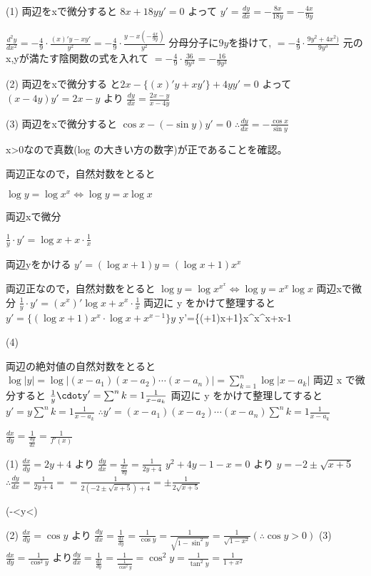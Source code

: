 (1) 両辺をxで微分すると 
$
8x+18yy'=0
$
よって
$
y'=\frac{dy}{dx}=-\frac{8x}{18y}=-\frac{4x}{9y}
$

$
\frac{d^2y}{dx^2}=-\frac{4}{9}\cdot\frac{(x)'y-xy'}{y^2}=-\frac{4}{9}\cdot\frac{y-x(-\frac{4x}{9y})}{y^2}
$
分母分子に$ 9y$を掛けて, 
$
= -\frac{4}{9}\cdot\frac{9y^2+4x^2)}{9y^3}
$
元のx,yが満たす陰関数の式を入れて
$
= -\frac{4}{9}\cdot\frac{36}{9y^3}
= -\frac{16}{9y^3}
$

(2) 両辺をxで微分する と$ 2x -\{(x)'y+xy'\}+4yy'=0$
よって $(x-4y)y'=2x-y$ より $\frac{dy}{dx}=\frac{2x-y}{x-4y}$

(3) 両辺をxで微分すると $\cos{x}-(-\sin{y})y'=0$
$\therefore \frac{dy}{dx}=-\frac{\cos{x}}{\sin{y}}$

x>0なので真数(log の大きい方の数字)が正であることを確認。

両辺正なので，自然対数をとると

$
\log{y}=\log{x^x} \Leftrightarrow 
\log{y}=x\log{x} 
$

両辺xで微分

$
\frac{1}{y}\cdot y'=\log{x}+x\cdot\frac{1}{x}
$

両辺yをかける
$
y'=(\log{x}+1)y=(\log{x}+1)x^x
$

両辺正なので，自然対数をとると
$
\log{y}=\log{x^{x^x}} \Leftrightarrow \log{y}=x^x\log{x}
$
両辺xで微分 
$
\frac{1}{y}\cdot y'=(x^x)'\log{x}+x^x\cdot\frac{1}{x}
$
両辺に y をかけて整理すると
$
y'=\{(\log{x}+1)x^x\cdot\log{x}+x^{x-1}\}y
$
\therefore y'=\{(+1)x+1\}x^{x^x+x-1}

(4)

両辺の絶対値の自然対数をとると
$
\log{|y|}=\log{|(x-a_1)(x-a_2)\cdots(x-a_n)|}=\sum^{n}_{k=1}\log{|x-a_k|}
$
両辺 x で微分すると
$
\frac{1}{y}\cdoty'=\sum^{n}{k=1}\frac{1}{x-a_k}
$
両辺に y をかけて整理してすると
$
y'=y\sum^{n}{k=1}\frac{1}{x-a_k}
$
$
\therefore y'=(x-a_1)(x-a_2)\cdots(x-a_n)\sum^{n}{k=1}\frac{1}{x-a_k}
$

$
\frac{dx}{dy}=\frac{1}{\frac{dy}{dx}}=\frac{1}{f'(x)}
$

(1)  
$
\frac{dx}{dy}=2y+4
$
より
$
\frac{dy}{dx}=\frac{1}{\frac{dx}{dy}}=\frac{1}{2y+4}
$
$
y^2+4y-1-x=0  
$
より
$
y=-2\pm\sqrt{x+5}
$
$
\therefore \frac{dy}{dx}=\frac{1}{2y+4}==\frac{1}{2(-2\pm\sqrt{x+5})+4} = \pm\frac{1}{2\sqrt{x+5}}
$

(-<y<)

(2)
$
\frac{dx}{dy}=\cos{y}
$
より
$
\frac{dy}{dx}=\frac{1}{\frac{dx}{dy}}=\frac{1}{\cos{y}}=\frac{1}{\sqrt{1-\sin^2{y}}}=\frac{1}{\sqrt{1-x^2}} (\therefore \cos{y}>0)
$
(3) $
\frac{dx}{dy}=\frac{1}{\cos^2{y}}
$ より$
\frac{dy}{dx}=\frac{1}{\frac{dx}{dy}}=\frac{1}{\frac{1}{\cos^2{y}}}=\cos^2{y}=\frac{1}{\tan^2{y}}=\frac{1}{1+x^2}
$

